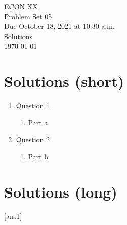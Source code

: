 \noindent
\Large ECON XX \\
 	\large Problem Set 05 \\
 	\large Due October 18, 2021 at 10:30 a.m.\\
 	\large Solutions \\
 	\today \\[1.5em] %

\section*{Solutions (short)}
    \begin{enumerate}
        \item Question 1
        \begin{enumerate}
            
        \item Part a
        \end{enumerate}
        
        \item Question 2
        \begin{enumerate}
            \item Part b
        \end{enumerate}
    \end{enumerate}

\section*{Solutions (long)}

[ans1]

